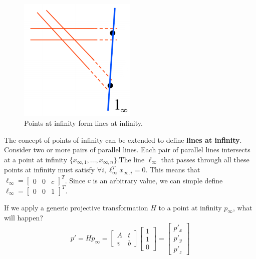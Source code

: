 \documentclass[a4paper, 12pt]{article}
\renewcommand\emph{\textbf}
\begin{document}
\begin{figure}[h!]
\centering
\includegraphics[width=0.5\textwidth]{figures/line_infinity.png}
\caption{Points at infinity form lines at infinity.}
\label{fig:line_infinity}
\end{figure}

The concept of points of infinity can be extended to define \emph{lines at infinity}. Consider two or more pairs of parallel lines. Each pair of parallel lines intersects at a point at infinity $\{x_{\infty,1},...,x_{\infty,n}\}$.The line $\ell_\infty$ that passes through all these points at infinity must satisfy $\forall i, \ell_\infty^T x_{\infty,i}= 0$. This means that $\ell_\infty = \begin{bmatrix}0 & 0 & c\end{bmatrix}^T$. Since $c$ is an arbitrary value, we can simple define $\ell_\infty = \begin{bmatrix}0 & 0 & 1\end{bmatrix}^T$.

If we apply a generic projective transformation $H$ to a point at infinity $p_\infty$, what will happen? 
\begin{equation}
p' =Hp_\infty = \begin{bmatrix} A &t \\ v&b \end{bmatrix}\begin{bmatrix}1\\1\\0\end{bmatrix} = \begin{bmatrix}p'_x\\ p'_y\\p'_z\end{bmatrix}
\end{equation}
\end{document}
